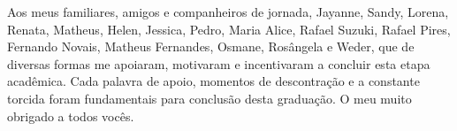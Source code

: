\begin{agradecimentos}

Aos meus familiares, amigos e companheiros de jornada, Jayanne, Sandy, Lorena, Renata, Matheus, Helen, Jessica, Pedro, Maria Alice, Rafael Suzuki, Rafael Pires, Fernando Novais, Matheus Fernandes, Osmane, Rosângela e Weder, que de diversas formas me apoiaram, motivaram e incentivaram a concluir esta etapa acadêmica. Cada palavra de apoio, momentos de descontração e a constante torcida foram fundamentais para conclusão desta graduação. O meu muito obrigado a todos vocês.

\end{agradecimentos}